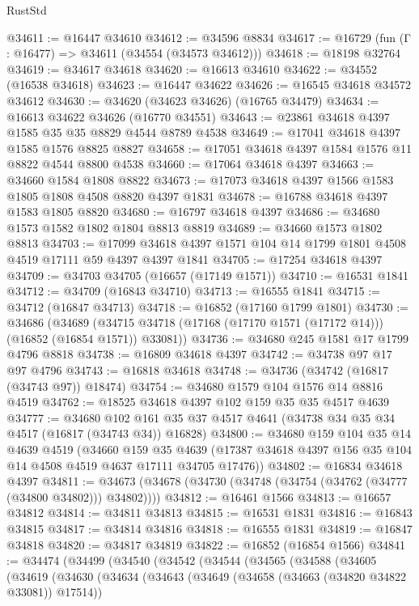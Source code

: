 \begin{lexlean}{RustStd}
\begin{coremodule}
{\begin{coremodule}
{{{{{{{{{{{{{{{{{{{{{{{{{{{{{{{{{{{{{{{{{{{{{{{{{{{{{{{@34611 := @16447 @34610
@34612 := @34596 @8834
@34617 := @16729 (fun (Γ : @16477) => @34611 (@34554 (@34573 @34612)))
@34618 := @18198 @32764
@34619 := @34617 @34618
@34620 := @16613 @34610
@34622 := @34552 (@16538 @34618)
@34623 := @16447 @34622
@34626 := @16545 @34618 @34572 @34612
@34630 := @34620 (@34623 @34626) (@16765 @34479)
@34634 := @16613 @34622 @34626 (@16770 @34551)
@34643 := @23861 @34618 @4397 @1585 @35 @35 @8829 @4544 @8789 @4538
@34649 := @17041 @34618 @4397 @1585 @1576 @8825 @8827
@34658 := @17051 @34618 @4397 @1584 @1576 @11 @8822 @4544 @8800 @4538
@34660 := @17064 @34618 @4397
@34663 := @34660 @1584 @1808 @8822
@34673 := @17073 @34618 @4397 @1566 @1583 @1805 @1808 @4508 @8820 @4397 @1831
@34678 := @16788 @34618 @4397 @1583 @1805 @8820
@34680 := @16797 @34618 @4397
@34686 := @34680 @1573 @1582 @1802 @1804 @8813 @8819
@34689 := @34660 @1573 @1802 @8813
@34703 := @17099 @34618 @4397 @1571 @104 @14 @1799 @1801 @4508 @4519 @17111 @59 @4397 @4397 @1841
@34705 := @17254 @34618 @4397
@34709 := @34703 @34705 (@16657 (@17149 @1571))
@34710 := @16531 @1841
@34712 := @34709 (@16843 @34710)
@34713 := @16555 @1841
@34715 := @34712 (@16847 @34713)
@34718 := @16852 (@17160 @1799 @1801)
@34730 := @34686
    (@34689 (@34715 @34718 (@17168 (@17170 @1571 (@17172 @14))) (@16852 (@16854 @1571)) @33081))
@34736 := @34680 @245 @1581 @17 @1799 @4796 @8818
@34738 := @16809 @34618 @4397
@34742 := @34738 @97 @17 @97 @4796
@34743 := @16818 @34618
@34748 := @34736 (@34742 (@16817 (@34743 @97)) @18474)
@34754 := @34680 @1579 @104 @1576 @14 @8816 @4519
@34762 := @18525 @34618 @4397 @102 @159 @35 @35 @4517 @4639
@34777 := @34680
    @102
    @161
    @35
    @37
    @4517
    @4641
    (@34738 @34 @35 @34 @4517 (@16817 (@34743 @34)) @16828)
@34800 := @34680
    @159
    @104
    @35
    @14
    @4639
    @4519
    (@34660
      @159
      @35
      @4639
      (@17387 @34618 @4397 @156 @35 @104 @14 @4508 @4519 @4637 @17111 @34705 @17476))
@34802 := @16834 @34618 @4397
@34811 := @34673 (@34678 (@34730 (@34748 (@34754 (@34762 (@34777 (@34800 @34802))) @34802))))
@34812 := @16461 @1566
@34813 := @16657 @34812
@34814 := @34811 @34813
@34815 := @16531 @1831
@34816 := @16843 @34815
@34817 := @34814 @34816
@34818 := @16555 @1831
@34819 := @16847 @34818
@34820 := @34817 @34819
@34822 := @16852 (@16854 @1566)
@34841 := @34474
    (@34499
      (@34540
        (@34542
          (@34544
            (@34565
              (@34588
                (@34605
                  (@34619
                    (@34630
                      (@34634
                        (@34643
                          (@34649 (@34658 (@34663 (@34820 @34822 @33081)) @17514))
}}}}}}}}}}}}}}}}}}}}}}}}}}}}}}}}}}}}}}}}}}}}}}}}}}}}}}}
\end{coremodule}}
\end{coremodule}
\end{lexlean}
